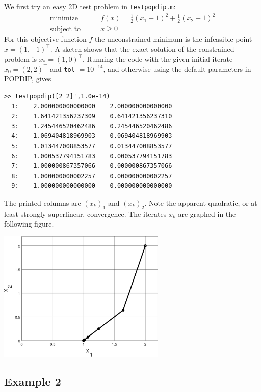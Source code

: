 \documentclass[11pt]{article}
\begin{document}
We first try an easy 2D test problem in \href{http://bueler.github.io/M661F18/matlab/testpopdip.m}{\texttt{testpopdip.m}}:
\begin{equation}
\begin{matrix}
\text{minimize} \qquad & f(x) = \frac{1}{2} (x_1-1)^2 + \frac{1}{2} (x_2+1)^2 \\
\text{subject to} \qquad & x \ge 0
\end{matrix} \label{testoneproblem}
\end{equation}
For this objective function $f$ the unconstrained minimum is the infeasible point $\hat x =(1,-1)^\top$.  A sketch shows that the exact solution of the constrained problem is $x_*=(1,0)^\top$.  Running the code with the given initial iterate $x_0=(2,2)^\top$ and \texttt{tol} $=10^{-14}$, and otherwise using the default parameters in POPDIP, gives
\begin{Verbatim}[fontsize=\small]
>> testpopdip([2 2]',1.0e-14)
  1:    2.000000000000000    2.000000000000000
  2:    1.641421356237309    0.641421356237310
  3:    1.245446520462486    0.245446520462486
  4:    1.069404818969903    0.069404818969903
  5:    1.013447008853577    0.013447008853577
  6:    1.000537794151783    0.000537794151783
  7:    1.000000867357066    0.000000867357066
  8:    1.000000000002257    0.000000000002257
  9:    1.000000000000000    0.000000000000000
\end{Verbatim}
The printed columns are $(x_k)_1$ and $(x_k)_2$.  Note the apparent quadratic, or at least strongly superlinear, convergence.  The iterates $x_k$ are graphed in the following figure.

\bigskip
\begin{center}
\includegraphics[width=0.6\textwidth]{testpopdip}
\end{center}


\subsection*{Example 2}
\end{document}
